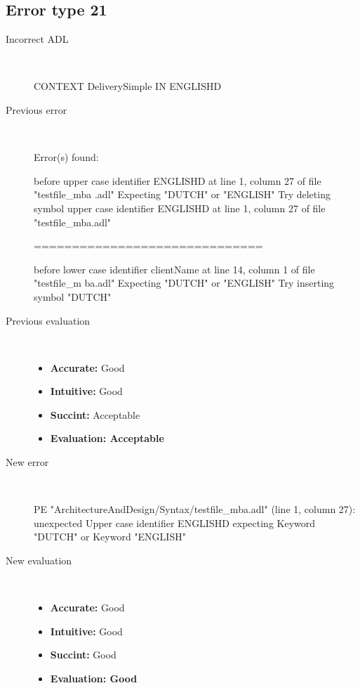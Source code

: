 \hrulefill

\subsection{Error type 21}
  \begin{description}
  \item[Incorrect ADL]~\\
\begin{adl}
CONTEXT DeliverySimple IN ENGLISHD\end{adl}
  \item[Previous error]~\\
\begin{haskell}
Error(s) found:

before upper case identifier ENGLISHD at line 1, column 27 of file "testfile_mba
.adl"
Expecting "DUTCH" or "ENGLISH"
Try deleting symbol upper case identifier ENGLISHD at line 1, column 27 of file
"testfile_mba.adl"

==============================

before lower case identifier clientName at line 14, column 1 of file "testfile_m
ba.adl"
Expecting "DUTCH" or "ENGLISH"
Try inserting symbol "DUTCH"\end{haskell}
  \item[Previous evaluation]~\\
    \begin{itemize}
    \item \textbf{Accurate:} Good
    \item \textbf{Intuitive:} Good
    \item \textbf{Succint:} Acceptable
    \item \textbf{Evaluation: Acceptable}
    \end{itemize}
  \item[New error]~\\
\begin{haskell}
PE "ArchitectureAndDesign/Syntax/testfile_mba.adl" (line 1, column 27):
unexpected Upper case identifier ENGLISHD
expecting Keyword "DUTCH" or Keyword "ENGLISH"\end{haskell}
  \item[New evaluation]~\\
    \begin{itemize}
    \item \textbf{Accurate:} Good
    \item \textbf{Intuitive:} Good
    \item \textbf{Succint:} Good
    \item \textbf{Evaluation: Good
}
    \end{itemize}
  \end{description}


